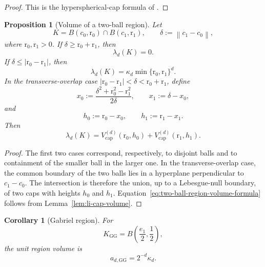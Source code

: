 \documentclass[a4paper,fleqn]{cas-dc}
\numberwithin{equation}{section}
\newcommand{\1}{\mathds{1}}
\newcommand{\norm}[1]{\left\lVert #1\right\rVert}
\newcommand{\0}{\mathbf{0}}
\newtheorem{corollary}[theorem]{Corollary}
\newtheorem{proposition}[theorem]{Proposition}
\begin{document}
\begin{proof}
This is the hyperspherical-cap formula of \citet{li2011concise}.
\end{proof}

\begin{proposition}[Volume of a two-ball region]
\label{prop:two-ball-region-volume}
Let
\begin{equation}\label{eq:two-ball-region-def}
K = B(c_0,\mathrm{r}_0) \cap B(c_1,\mathrm{r}_1), \qquad \delta := \norm{c_1-c_0},
\end{equation}
where $\mathrm{r}_0,\mathrm{r}_1>0$. If $\delta \geq \mathrm{r}_0+\mathrm{r}_1$, then
\begin{equation}\label{eq:two-ball-disjoint}
\lambda_d(K) = 0.
\end{equation}
If $\delta \leq |\mathrm{r}_0-\mathrm{r}_1|$, then
\begin{equation}\label{eq:two-ball-containment}
\lambda_d(K) = \kappa_d \min\{\mathrm{r}_0,\mathrm{r}_1\}^d.
\end{equation}
In the transverse-overlap case $|\mathrm{r}_0-\mathrm{r}_1| < \delta < \mathrm{r}_0+\mathrm{r}_1$, define
\begin{equation}\label{eq:transverse-overlap-x}
x_0 := \frac{\delta^2+\mathrm{r}_0^2-\mathrm{r}_1^2}{2\delta}, \qquad x_1 := \delta-x_0,
\end{equation}
and
\begin{equation}\label{eq:transverse-overlap-h}
h_0 := \mathrm{r}_0-x_0, \qquad h_1 := \mathrm{r}_1-x_1.
\end{equation}
Then
\begin{equation}\label{eq:two-ball-region-volume-formula}
\lambda_d(K) = V_{\mathrm{cap}}^{(d)}(\mathrm{r}_0,h_0) + V_{\mathrm{cap}}^{(d)}(\mathrm{r}_1,h_1).
\end{equation}
\end{proposition}

\begin{proof}
The first two cases correspond, respectively, to disjoint balls and to containment of the smaller ball in the larger one. In the transverse-overlap case, the common boundary of the two balls lies in a hyperplane perpendicular to $c_1-c_0$. The intersection is therefore the union, up to a Lebesgue-null boundary, of two caps with heights $h_0$ and $h_1$. Equation~\eqref{eq:two-ball-region-volume-formula} follows from Lemma~\ref{lem:li-cap-volume}.
\end{proof}

\begin{corollary}[Gabriel region]
\label{cor:Gabriel-region-volume}
For
\begin{equation}\label{eq:Gabriel-region-def}
K_{\mathrm{GG}} = B\left(\frac{e_1}{2},\frac{1}{2}\right),
\end{equation}
the unit region volume is
\begin{equation}\label{eq:gg-constant}
a_{d,\mathrm{GG}} = 2^{-d}\kappa_d.
\end{equation}
\end{corollary}
\end{document}
